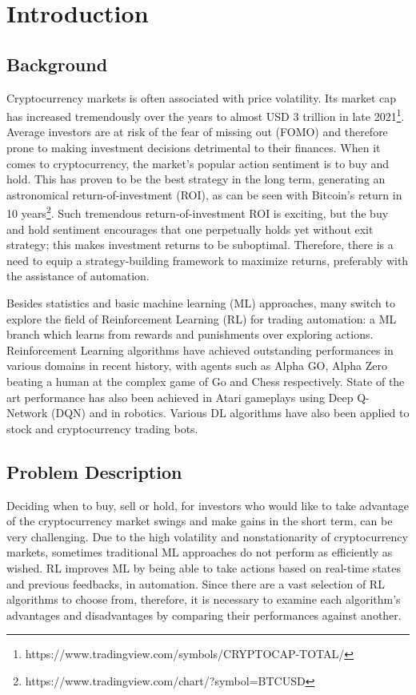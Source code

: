 \chapter{Introduction}
\label{Introduction}

\section{Background}
Cryptocurrency markets is often associated with price volatility. Its market cap has increased tremendously over the years to almost USD 3 trillion in late 2021\footnote{https://www.tradingview.com/symbols/CRYPTOCAP-TOTAL/}. Average investors are at risk of the fear of missing out (FOMO) and therefore prone to making investment decisions detrimental to their finances. When it comes to cryptocurrency, the market's popular action sentiment is to buy and hold. This has proven to be the best strategy in the long term, generating an astronomical return-of-investment (ROI), as can be seen with Bitcoin's return in 10 years\footnote{https://www.tradingview.com/chart/?symbol=BTCUSD}. Such tremendous return-of-investment ROI is exciting, but the buy and hold sentiment encourages that one perpetually holds yet without exit strategy; this makes investment returns to be suboptimal. Therefore, there is a need to equip a strategy-building framework to maximize returns, preferably with the assistance of automation.

Besides statistics and basic machine learning (ML) approaches, many switch to explore the field of Reinforcement Learning (RL) for trading automation: a ML branch which learns from rewards and punishments over exploring actions. Reinforcement Learning algorithms have achieved outstanding performances in various domains in recent history, with agents such as Alpha GO, Alpha Zero beating a human at the complex game of Go and Chess respectively. State of the art performance has also been achieved in Atari gameplays using Deep Q-Network (DQN) and in robotics. Various DL algorithms have also been applied to stock and cryptocurrency trading bots.

\section{Problem Description}

Deciding when to buy, sell or hold, for investors who would like to take advantage of the cryptocurrency market swings and make gains in the short term, can be very challenging. Due to the high volatility and nonstationarity of cryptocurrency markets, sometimes traditional ML approaches do not perform as efficiently as wished. RL improves ML by being able to take actions based on real-time states and previous feedbacks, in automation. Since there are a vast selection of RL algorithms to choose from, therefore, it is necessary to examine each algorithm's advantages and disadvantages by comparing their performances against another.

